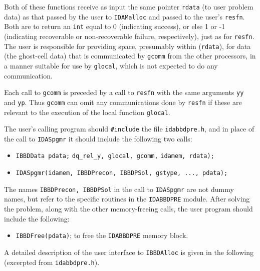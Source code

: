 \documentclass[11pt]{article}
\begin{document}
Both of these functions receive as input the same pointer {\tt rdata}
(to user problem data) as that passed by the user to {\tt IDAMalloc}
and passed to the user's {\tt resfn}.  Both are to return an {\tt int}
equal to 0 (indicating success), or else 1 or -1 (indicating
recoverable or non-recoverable failure, respectively), just as for
{\tt resfn}.  The user is responsible for providing space, presumably
within ({\tt *rdata}), for data (the ghost-cell data) that is
communicated by {\tt gcomm} from the other processors, in a manner
suitable for use by {\tt glocal}, which is not expected to do any
communication.

Each call to {\tt gcomm} is preceded by a call to {\tt resfn} with the
same arguments {\tt yy} and {\tt yp}. Thus {\tt gcomm} can omit any
communications done by {\tt resfn} if these are relevant to the
execution of the local function {\tt glocal}.

The user's calling program should {\tt \#include} the file 
{\tt idabbdpre.h}, and in place of the call to {\tt IDASpgmr} it
should include the following two calls:

\begin{itemize}

\item {\tt IBBDData pdata;}
         {\tt dq\_rel\_y, glocal, gcomm,}
\newline \hspace*{1.5in} {\tt idamem, rdata);}
\item  {\tt IDASpgmr(idamem, IBBDPrecon, IBBDPSol, gstype, ..., pdata);}

\end{itemize}
The names {\tt IBBDPrecon, IBBDPSol} in the call to {\tt IDASpgmr}
are not dummy names, but refer to the specific routines in the
{\tt IDABBDPRE} module.
After solving the problem, along with the other memory-freeing calls,
the user program should include the following:

\begin{itemize}
\item  {\tt IBBDFree(pdata)}; to free the {\tt IDABBDPRE} memory block.
\end{itemize}

A detailed description of the user interface to {\tt IBBDAlloc} is
given in the following (excerpted from {\tt idabbdpre.h}).
\end{document}
